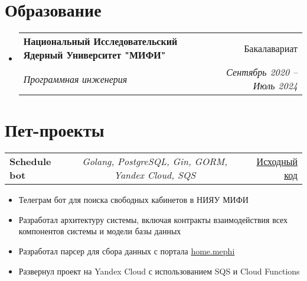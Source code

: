 \documentclass[a4paper,11pt]{article}
\makeatletter
\newcommand{\resumeItem}[1]{
  \item\small{#1}
}
\newcommand{\resumeItemListStart}{\begin{itemize}[rightmargin=0.11in]}
\newcommand{\resumeItemListEnd}{\end{itemize}}
\newcommand{\resumeTrioHeading}[3]{
  \item\small{
    \begin{tabular*}{0.96\textwidth}[t]{
      l@{\extracolsep{\fill}}c@{\extracolsep{\fill}}r
    }
      \textbf{#1} & \textit{#2} & #3
    \end{tabular*}
  }
}
\newcommand{\resumeQuadHeading}[4]{
  \item
  \begin{tabular*}{0.96\textwidth}[t]{l@{\extracolsep{\fill}}r}
    \textbf{#1} & #2 \\
    \textit{\small#3} & \textit{\small #4} \\
  \end{tabular*}
}
\newcommand{\resumeQuadHeadingChild}[2]{
  \item
  \begin{tabular*}{0.96\textwidth}[t]{l@{\extracolsep{\fill}}r}
    \textbf{\small#1} & {\small#2} \\
  \end{tabular*}
}
\newcommand{\resumeHeadingListStart}{
  \begin{itemize}[leftmargin=0.15in, label={}]
}
\newcommand{\resumeHeadingListEnd}{\end{itemize}}
\makeatother
\begin{document}



\section{Образование}
  \resumeHeadingListStart{}
    \resumeQuadHeading{Национальный Исследовательский Ядерный Университет "МИФИ"}{Бакалавариат}
    {Программная инженерия}{Сентябрь 2020 -- Июль 2024}
  \resumeHeadingListEnd{}



\section{Пет-проекты}
      \resumeTrioHeading{Schedule bot}{Golang, PostgreSQL, Gin, GORM, Yandex Cloud, SQS}{\href{https://github.com/PotatoHD404/ParallelDB}{\uline{Исходный код}}}
      \resumeItemListStart{}
        \resumeItem{Телеграм бот для поиска свободных кабинетов в НИЯУ МИФИ}
        \resumeItem{Разработал архитектуру системы, включая контракты взаимодействия всех компонентов системы и модели базы данных}
        \resumeItem{Разработал парсер для сбора данных с портала \href{https://home.mephi.ru}{home.mephi}}
        \resumeItem{Развернул проект на Yandex Cloud с использованием SQS и Cloud Functions}
  \resumeHeadingListEnd{}
\end{document}

